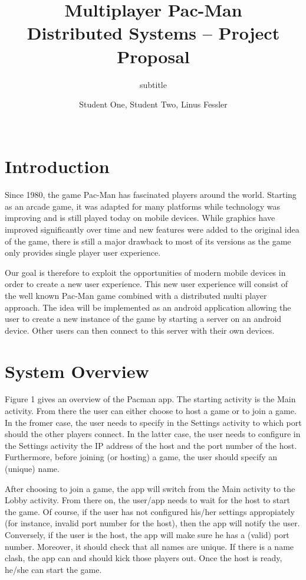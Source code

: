 \documentclass{report}
\title{Multiplayer Pac-Man\\
\normalsize{Distributed Systems -- Project Proposal}}
\subtitle{subtitle}
\author{
%
%
\alignauthor \normalsize{Student One,  Student Two, Linus Fessler}\\
	\affaddr{\normalsize{ETH ID-1 XX-XXX-XXX, ETH ID-2 XX-XXX-XXX, ETH ID-3 14-924-203}}\\
	\email{\normalsize{one@student.ethz.ch, two@student.ethz.ch, fesslerl@student.ethz.ch}}
}
\begin{document}
\maketitle

\section{Introduction}


Since 1980, the game Pac-Man has fascinated players around the world. 
Starting as an arcade game, it was adapted for many platforms while technology was improving and is still played today on mobile devices.
While graphics have improved significantly over time and new features were added to the original idea of the game, there is still a major drawback to most of its versions as the game only provides single player user experience.

 
Our goal is therefore to exploit the opportunities of modern mobile devices in order to create a new user experience. 
This new user experience will consist of the well known Pac-Man game combined with a distributed multi player approach.
The idea will be implemented as an android application allowing the user to create a new instance of the game by starting a server on an android device. 
Other users can then connect to this server with their own devices.



\section{System Overview}


Figure 1 gives an overview of the Pacman app. The starting activity is the Main activity. 
From there the user can either choose to host a game or to join a game. 
In the fromer case, the user needs to specify in the Settings activity to which port should the other players connect. 
In the latter case, the user needs to configure in the Settings activity the IP address of the host and the port number of the host. 
Furthermore, before joining (or hosting) a game, the user should specify an (unique) name.


After choosing to join a game, the app will switch from the Main activity to the Lobby activity.
From there on, the user/app needs to wait for the host to start the game. Of course, if the user has not configured his/her settings appropiately (for instance, invalid port number for the host), then the app will notify the user. 
Conversely, if the user is the host, the app will make sure he has a (valid) port number. 
Moreover, it should check that all names are unique. If there is a name clash, the app can and should kick those players out. Once the host is ready, he/she can start the game.
\end{document}
